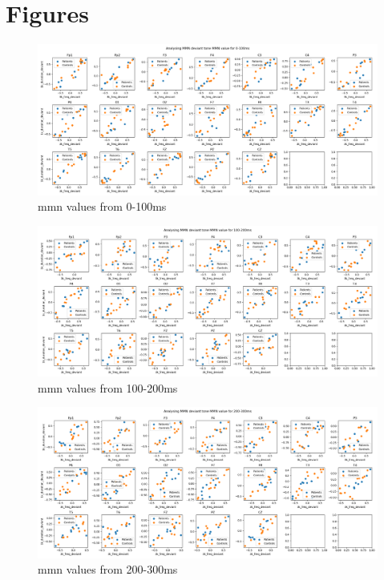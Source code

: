 \documentclass[10pt]{article}
\begin{document}
\section{Figures}
\begin{figure}[H]
  \includegraphics[width=16cm]{../../../data_analysis_results/MMN/features/deviant_tone_0.png}
  \caption{\gls{mmn} values from 0-100ms}\label{mmnvalue_0_100ms}
\end{figure}
\begin{figure}[H]
  \includegraphics[width=16cm]{../../../data_analysis_results/MMN/features/deviant_tone_1.png}
  \caption{\gls{mmn} values from 100-200ms}\label{mmnvalue_100_200ms}
\end{figure}
\begin{figure}[H]
  \includegraphics[width=16cm]{../../../data_analysis_results/MMN/features/deviant_tone_2.png}
  \caption{\gls{mmn} values from 200-300ms}\label{mmnvalue_200_300ms}
\end{figure}
\end{document}
